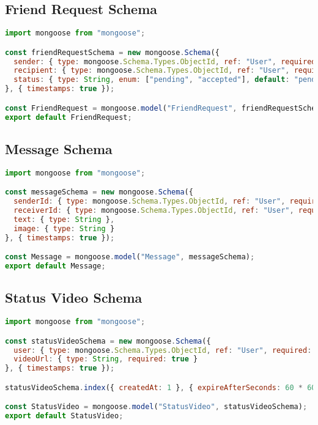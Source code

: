 \documentclass[12pt,a4paper]{report}
\begin{document}
\subsection{Friend Request Schema}

\begin{lstlisting}[language=JavaScript, caption={Friend Request Schema}, label={lst:friendschema}]
import mongoose from "mongoose";

const friendRequestSchema = new mongoose.Schema({
  sender: { type: mongoose.Schema.Types.ObjectId, ref: "User", required: true },
  recipient: { type: mongoose.Schema.Types.ObjectId, ref: "User", required: true },
  status: { type: String, enum: ["pending", "accepted"], default: "pending" },
}, { timestamps: true });

const FriendRequest = mongoose.model("FriendRequest", friendRequestSchema);
export default FriendRequest;
\end{lstlisting}

\subsection{Message Schema}

\begin{lstlisting}[language=JavaScript, caption={Message Schema}, label={lst:messageschema}]
import mongoose from "mongoose";

const messageSchema = new mongoose.Schema({
  senderId: { type: mongoose.Schema.Types.ObjectId, ref: "User", required: true },
  receiverId: { type: mongoose.Schema.Types.ObjectId, ref: "User", required: true },
  text: { type: String },
  image: { type: String }
}, { timestamps: true });

const Message = mongoose.model("Message", messageSchema);
export default Message;
\end{lstlisting}

\subsection{Status Video Schema}

\begin{lstlisting}[language=JavaScript, caption={Status Video Schema}, label={lst:statusschema}]
import mongoose from "mongoose";

const statusVideoSchema = new mongoose.Schema({
  user: { type: mongoose.Schema.Types.ObjectId, ref: "User", required: true },
  videoUrl: { type: String, required: true }
}, { timestamps: true });

statusVideoSchema.index({ createdAt: 1 }, { expireAfterSeconds: 60 * 60 * 24 });

const StatusVideo = mongoose.model("StatusVideo", statusVideoSchema);
export default StatusVideo;
\end{lstlisting}
\end{document}

